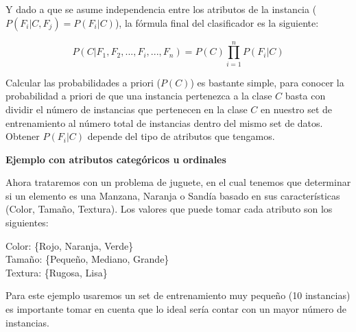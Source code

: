 \documentclass[11pt,fleqn]{book} %
\begin{document}
Y dado a que se asume independencia entre los atributos de la instancia ($P(F_{i}\vert C,F_{j})=P(F_{i}\vert C)$), la fórmula final del clasificador es la siguiente:

\begin{equation}
P(C|F_{1},F_{2},...,F_{i},...,F_{n}) = P(C) \prod_{i=1}^n P(F_i \vert C)
\label{eqn:clasificadorBayesianoFinal} 
\end{equation}

Calcular las probabilidades a priori ($P(C)$) es bastante simple, para conocer la probabilidad a priori de que una instancia pertenezca a la clase $C$ basta con dividir el número de instancias que pertenecen en la clase $C$ en nuestro set de entrenamiento al número total de instancias dentro del mismo set de datos. Obtener $P(F_i \vert C)$ depende del tipo de atributos que tengamos.

\textbf{Ejemplo con atributos categóricos u ordinales}

Ahora trataremos con un problema de juguete, en el cual tenemos que determinar si un elemento es una Manzana, Naranja o Sandía basado en sus características (Color, Tamaño, Textura).
Los valores que puede tomar cada atributo son los siguientes:

Color: \{Rojo, Naranja, Verde\}\\
Tamaño: \{Pequeño, Mediano, Grande\}\\
Textura: \{Rugosa, Lisa\}

Para este ejemplo usaremos un set de entrenamiento muy pequeño (10 instancias) es importante tomar en cuenta que lo ideal sería contar con un mayor número de instancias.
\end{document}
